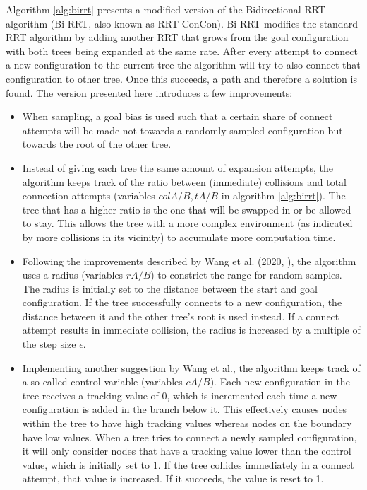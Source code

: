 \documentclass{article}
\begin{document}
Algorithm \ref{alg:birrt} presents a modified version of the Bidirectional RRT algorithm (Bi-RRT, also known as RRT-ConCon). Bi-RRT modifies the standard RRT algorithm by adding another RRT that grows from the goal configuration with both trees being expanded at the same rate. After every attempt to connect a new configuration to the current tree the algorithm will try to also connect that configuration to other tree. Once this succeeds, a path and therefore a solution is found. The version presented here introduces a few improvements:
\begin{itemize}
    \item When sampling, a goal bias is used such that a certain share of connect attempts will be made not towards a randomly sampled configuration but towards the root of the other tree.
    \item Instead of giving each tree the same amount of expansion attempts, the algorithm keeps track of the ratio between (immediate) collisions and total connection attempts (variables $colA/B, tA/B$ in algorithm \ref{alg:birrt}). The tree that has a higher ratio is the one that will be swapped in or be allowed to stay. This allows the tree with a more complex environment (as indicated by more collisions in its vicinity) to accumulate more computation time.
    \item Following the improvements described by Wang et al. (2020, \cite{first}), the algorithm uses a radius (variables $rA/B$) to constrict the range for random samples. The radius is initially set to the distance between the start and goal configuration. If the tree successfully connects to a new configuration, the distance between it and the other tree's root is used instead. If a connect attempt results in immediate collision, the radius is increased by a multiple of the step size $\epsilon$.
    \item Implementing another suggestion by Wang et al., the algorithm keeps track of a so called control variable (variables $cA/B$). Each new configuration in the tree receives a tracking value of 0, which is incremented each time a new configuration is added in the branch below it. This effectively causes nodes within the tree to have high tracking values whereas nodes on the boundary have low values. When a tree tries to connect a newly sampled configuration, it will only consider nodes that have a tracking value lower than the control value, which is initially set to 1. If the tree collides immediately in a connect attempt, that value is increased. If it succeeds, the value is reset to 1.
\end{itemize}
\end{document}
